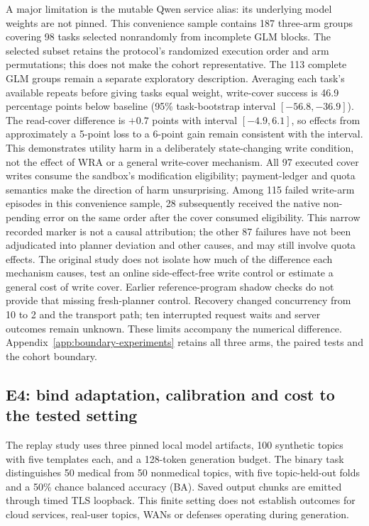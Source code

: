 A major limitation is the mutable Qwen service alias: its underlying model weights are not pinned. This convenience sample contains 187 three-arm groups covering 98 tasks selected nonrandomly from incomplete GLM blocks. The selected subset retains the protocol's randomized execution order and arm permutations; this does not make the cohort representative. The 113 complete GLM groups remain a separate exploratory description. Averaging each task's available repeats before giving tasks equal weight, write-cover success is 46.9 percentage points below baseline (95\% task-bootstrap interval $[-56.8,-36.9]$). The read-cover difference is $+0.7$ points with interval $[-4.9,6.1]$, so effects from approximately a 5-point loss to a 6-point gain remain consistent with the interval. This demonstrates utility harm in a deliberately state-changing write condition, not the effect of WRA or a general write-cover mechanism. All 97 executed cover writes consume the sandbox's modification eligibility; payment-ledger and quota semantics make the direction of harm unsurprising. Among 115 failed write-arm episodes in this convenience sample, 28 subsequently received the native non-pending error on the same order after the cover consumed eligibility. This narrow recorded marker is not a causal attribution; the other 87 failures have not been adjudicated into planner deviation and other causes, and may still involve quota effects. The original study does not isolate how much of the difference each mechanism causes, test an online side-effect-free write control or estimate a general cost of write cover. Earlier reference-program shadow checks do not provide that missing fresh-planner control. Recovery changed concurrency from 10 to 2 and the transport path; ten interrupted request waits and server outcomes remain unknown. These limits accompany the numerical difference. Appendix~\ref{app:boundary-experiments} retains all three arms, the paired tests and the cohort boundary.

\subsection{E4: bind adaptation, calibration and cost to the tested setting}
The replay study uses three pinned local model artifacts, 100 synthetic topics with five templates each, and a 128-token generation budget. The binary task distinguishes 50 medical from 50 nonmedical topics, with five topic-held-out folds and a 50\% chance balanced accuracy (BA). Saved output chunks are emitted through timed TLS loopback. This finite setting does not establish outcomes for cloud services, real-user topics, WANs or defenses operating during generation.

